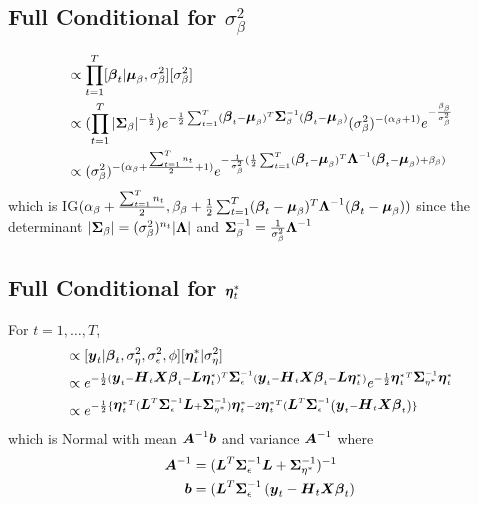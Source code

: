 \documentclass[fleqn]{article}
\def\bm#1{\mbox{\boldmath $#1$}}
\begin{document}
\subsection{Full Conditional for $\sigma^2_\beta$}
%
\begin{align*}
[\sigma^2_\beta | \cdot] & \propto \prod_{t = 1}^T [\bm{\beta}_t | \bm{\mu}_\beta, \sigma^2_\beta] [\sigma^2_\beta]\\
%
& \propto (\prod_{t = 1}^T |\bm{\Sigma}_\beta|^{ - \frac{1} {2}}) e^{ - \frac{1} {2} \sum_{t = 1}^T (\bm{\beta}_t - \bm{\mu}_\beta)^T \bm{\Sigma}_\beta^{ - 1} (\bm{\beta}_t - \bm{\mu}_\beta)} (\sigma^2_\beta)^{ - (\alpha_\beta + 1)} e^{ - \frac{\beta_\beta} {\sigma^2_\beta}}\\
%
& \propto (\sigma^2_\beta)^{ - (\alpha_\beta + \frac{\sum_{t = 1}^T n_t} {2} + 1)} e^{ - \frac{1} {\sigma^2_\beta} (\frac{1} {2} \sum_{t = 1}^T (\bm{\beta}_t - \bm{\mu}_\beta)^T \bm{\Lambda}^{ - 1} (\bm{\beta}_t - \bm{\mu}_\beta) + \beta_\beta)}
\end{align*}
%
which is IG$(\alpha_\beta + \frac{\sum_{t = 1}^T n_t} {2}, \beta_\beta + \frac{1} {2} \sum_{t = 1}^T (\bm{\beta}_t - \bm{\mu}_\beta)^T \bm{\Lambda}^{ - 1} (\bm{\beta}_t - \bm{\mu}_\beta))$ since the determinant $|\bm{\Sigma}_\beta| = (\sigma^2_\beta)^{n_t} | \bm{\Lambda} |$ and $\bm{\Sigma}_\beta^{ - 1} = \frac{1} {\sigma^2_\beta} \bm{\Lambda}^{ - 1}$
%
\subsection{Full Conditional for $\bm{\eta}^*_t$}
%
For $t = 1, \ldots, T$,
\begin{align*}
[\bm{\beta}_t | \cdot] & \propto [\bm{y}_t | \bm{\beta}_t, \sigma^2_\eta, \sigma^2_\epsilon, \phi] [\bm{\eta}^*_t | \sigma^2_\eta]\\
%
& \propto e^{ - \frac{1} {2} (\bm{y}_t - \bm{H}_t \bm{X} \bm{\beta}_t - \bm{L} \bm{\eta}^*_t)^T \bm{\Sigma}_{\epsilon}^{ - 1} (\bm{y}_t - \bm{H}_t \bm{X} \bm{\beta}_t - \bm{L} \bm{\eta}^*_t)} e^{ - \frac{1} {2} {\bm{\eta}^*_t}^T \bm{\Sigma}_{\eta^*}^{ - 1} \bm{\eta}^*_t }\\
%
& \propto e^{ - \frac{1} {2} \{{\bm{\eta}^*_t}^T (\bm{L}^T \bm{\Sigma}_\epsilon^{ - 1} \bm{L} + \bm{\Sigma}_{\eta^*}^{ - 1}) \bm{\eta}^*_t - 2 {\bm{\eta}^*_t}^T (\bm{L}^T \bm{\Sigma}_\epsilon^{ - 1} \left( \bm{y}_t - \bm{H}_t \bm{X} \bm{\beta}_t \right) \} }
\end{align*}
%
which is Normal with mean $ \bm{A}^{ - 1} \bm{b}$ and variance $\bm{A}^{ - 1}$ where
\begin{align*}
  \bm{A}^{ - 1} & = (\bm{L}^T \bm{\Sigma}_\epsilon^{ - 1} \bm{L} + \bm{\Sigma}_{\eta^*}^{ - 1})^{ - 1}\\
  \bm{b} & = (\bm{L}^T \bm{\Sigma}_\epsilon^{ - 1} \left( \bm{y}_t - \bm{H}_t \bm{X} \bm{\beta}_t \right)
\end{align*}
%
\end{document}
